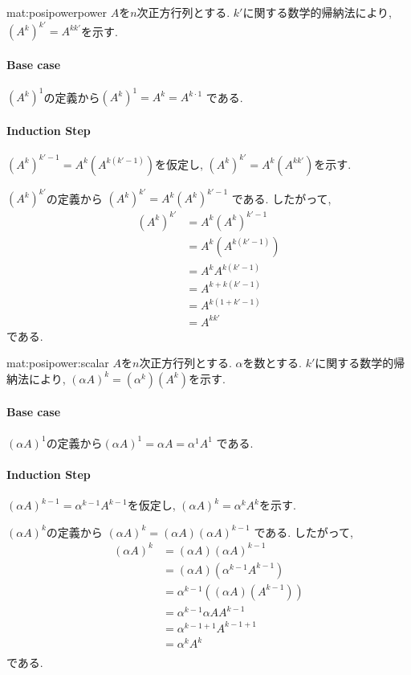 \begin{proofof*}{mat:posipower}{power}
  $A$を$n$次正方行列とする.
  $k'$に関する数学的帰納法により, $(A^{k})^{k'}=A^{kk'}$を示す.
  \paragraph{Base case}
  $(A^{k})^1$の定義から$(A^{k})^1=A^{k}=A^{k\cdot 1}$
  である.
  
  \paragraph{Induction Step}
  $(A^{k})^{k'-1}=A^{k}(A^{k(k'-1)})$を仮定し,
  $(A^{k})^{k'}=A^{k}(A^{kk'})$を示す.

  $(A^{k})^{k'}$の定義から
    $(A^{k})^{k'}=A^{k}(A^{k})^{k'-1}$
  である. したがって,
  \begin{align*}
    (A^{k})^{k'}&=A^{k}(A^{k})^{k'-1}\\
    &=A^{k}(A^{k(k'-1)})\\
    &=A^{k}A^{k(k'-1)}\\
    &=A^{k+k(k'-1)}\\
    &=A^{k(1+k'-1)}\\
    &=A^{kk'}
  \end{align*}
  である.
\end{proofof*}

\begin{proofof}{mat:posipower:scalar}
  $A$を$n$次正方行列とする.
  $\alpha$を数とする.
  $k'$に関する数学的帰納法により, $(\alpha A)^{k}=(\alpha^k)(A^{k})$を示す.

  \paragraph{Base case}
  $(\alpha A)^1$の定義から$(\alpha A)^1=\alpha A=\alpha^1A^{1}$
  である.
  
  \paragraph{Induction Step}
  $(\alpha A)^{k-1}=\alpha^{k-1} A^{k-1}$を仮定し,
  $(\alpha A)^{k}=\alpha^{k} A^{k}$を示す.
  
  $(\alpha A)^{k}$の定義から
    $(\alpha A)^{k}=(\alpha A)(\alpha A)^{k-1}$
  である. したがって,
  \begin{align*}
    (\alpha A)^{k}
    &=(\alpha A)(\alpha A)^{k-1}\\
    &=(\alpha A)(\alpha^{k-1} A^{k-1})\\
    &=\alpha^{k-1}((\alpha A)(A^{k-1}))\\
    &=\alpha^{k-1}\alpha AA^{k-1}\\
    &=\alpha^{k-1+1} A^{k-1+1}\\
    &=\alpha^{k} A^{k}\\
  \end{align*}
  である.
  
\end{proofof}


